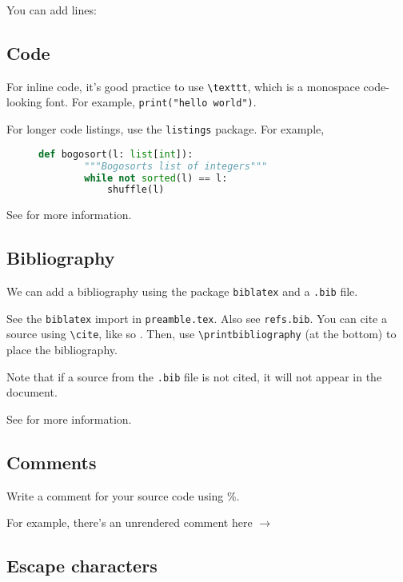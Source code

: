 \documentclass{article}
\begin{document}
You can add lines:

\subsection{Code}

For inline code, it's good practice to use \texttt{\textbackslash texttt}, which is a monospace code-looking font. For example, \texttt{print("hello world")}.

For longer code listings, use the \texttt{listings} package. For example,

\begin{figure}[h]
    \centering
    \begin{lstlisting}[language=Python]
    def bogosort(l: list[int]):
        """Bogosorts list of integers"""
        while not sorted(l) == l:
            shuffle(l)
    \end{lstlisting} 
\end{figure}

See \cite{overleaf_code} for more information.

\subsection{Bibliography}

We can add a bibliography using the package \texttt{biblatex} and a \texttt{.bib} file.

See the \texttt{biblatex} import in \texttt{preamble.tex}. Also see \texttt{refs.bib}. You can cite a source using \texttt{\textbackslash cite}, like so \cite{latex_vid_1} \cite{latex_vid_2}. Then, use \texttt{\textbackslash printbibliography} (at the bottom) to place the bibliography.

Note that if a source from the \texttt{.bib} file is not cited, it will not appear in the document.

See \cite{overleaf_bibliography} for more information.

\subsection{Comments}

Write a comment for your source code using \%.

For example, there's an unrendered comment here $\rightarrow$ %

\subsection{Escape characters}
\end{document}

